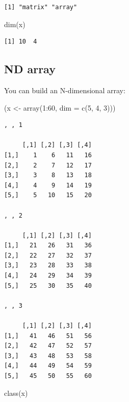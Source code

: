 \documentclass[
]{book}
\newenvironment{Shaded}{\begin{snugshade}}{\end{snugshade}}
\newcommand{\AttributeTok}[1]{\textcolor[rgb]{0.77,0.63,0.00}{#1}}
\newcommand{\DecValTok}[1]{\textcolor[rgb]{0.00,0.00,0.81}{#1}}
\newcommand{\FunctionTok}[1]{\textcolor[rgb]{0.00,0.00,0.00}{#1}}
\newcommand{\NormalTok}[1]{#1}
\newcommand{\OtherTok}[1]{\textcolor[rgb]{0.56,0.35,0.01}{#1}}
\newcommand{\SpecialCharTok}[1]{\textcolor[rgb]{0.00,0.00,0.00}{#1}}
\begin{document}
\begin{verbatim}
[1] "matrix" "array" 
\end{verbatim}

\begin{Shaded}
\begin{Highlighting}[]
\FunctionTok{dim}\NormalTok{(x)}
\end{Highlighting}
\end{Shaded}

\begin{verbatim}
[1] 10  4
\end{verbatim}

\hypertarget{nd-array}{%
\subsection{ND array}\label{nd-array}}

You can build an N-dimensional array:

\begin{Shaded}
\begin{Highlighting}[]
\NormalTok{(x }\OtherTok{\textless{}{-}} \FunctionTok{array}\NormalTok{(}\DecValTok{1}\SpecialCharTok{:}\DecValTok{60}\NormalTok{, }\AttributeTok{dim =} \FunctionTok{c}\NormalTok{(}\DecValTok{5}\NormalTok{, }\DecValTok{4}\NormalTok{, }\DecValTok{3}\NormalTok{)))}
\end{Highlighting}
\end{Shaded}

\begin{verbatim}
, , 1

     [,1] [,2] [,3] [,4]
[1,]    1    6   11   16
[2,]    2    7   12   17
[3,]    3    8   13   18
[4,]    4    9   14   19
[5,]    5   10   15   20

, , 2

     [,1] [,2] [,3] [,4]
[1,]   21   26   31   36
[2,]   22   27   32   37
[3,]   23   28   33   38
[4,]   24   29   34   39
[5,]   25   30   35   40

, , 3

     [,1] [,2] [,3] [,4]
[1,]   41   46   51   56
[2,]   42   47   52   57
[3,]   43   48   53   58
[4,]   44   49   54   59
[5,]   45   50   55   60
\end{verbatim}

\begin{Shaded}
\begin{Highlighting}[]
\FunctionTok{class}\NormalTok{(x)}
\end{Highlighting}
\end{Shaded}
\end{document}
